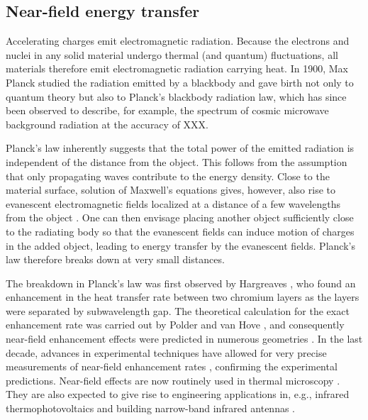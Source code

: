 

\subsection{Near-field energy transfer}

Accelerating charges emit electromagnetic radiation. Because the electrons and nuclei in any solid material undergo thermal (and quantum) fluctuations, all materials therefore emit electromagnetic radiation carrying heat. In 1900, Max Planck \cite{planck00a} studied the radiation emitted by a blackbody and gave birth not only to quantum theory but also to Planck's blackbody radiation law, which has since been observed to describe, for example, the spectrum of cosmic microwave background radiation at the accuracy of XXX.

Planck's law inherently suggests that the total power of the emitted radiation is independent of the distance from the object. This follows from the assumption that only propagating waves contribute to the energy density. Close to the material surface, solution of Maxwell's equations gives, however, also rise to evanescent electromagnetic fields localized at a distance of a few wavelengths from the object \cite{polder71}. One can then envisage placing another object sufficiently close to the radiating body so that the evanescent fields can induce motion of charges in the added object, leading to energy transfer by the evanescent fields. Planck's law therefore breaks down at very small distances. 

The breakdown in Planck's law was first observed by Hargreaves \cite{hargreaves59}, who found an enhancement in the heat transfer rate between two chromium layers as the layers were separated by subwavelength gap. The theoretical calculation for the exact enhancement rate was carried out by Polder and van Hove \cite{polder71}, and consequently near-field enhancement effects were predicted in numerous geometries \cite{loomis94,pendry99,carminati99,shchegrov00,mulet01,volokitin01}. In the last decade, advances in experimental techniques have allowed for very precise measurements of near-field enhancement rates \cite{}, confirming the experimental predictions. Near-field effects are now routinely used in thermal microscopy \cite{majumdar99,muller-hirsch99,kittel05,kittel08}. They are also expected to give rise to engineering applications in, e.g., infrared thermophotovoltaics \cite{dimatteo01,narayanaswamy03,laroche06} and building narrow-band infrared antennas \cite{greffet02}. 


